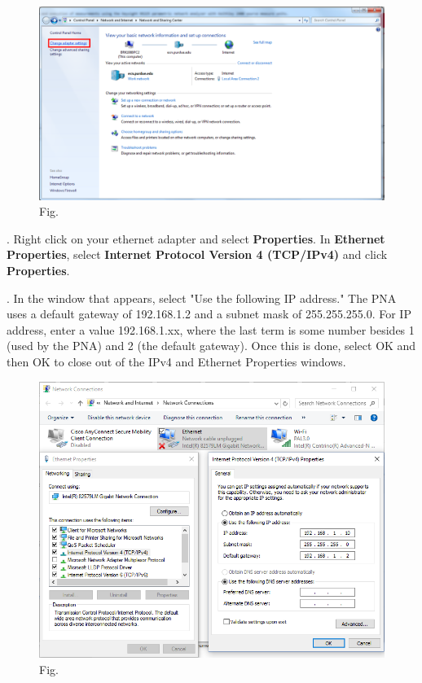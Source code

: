 \documentclass[]{article}
\begin{document}
\begin{figure}[H]
	\centering
	\includegraphics[width=\linewidth]{Figures/cp1}
	\caption{Fig.}
	\label{fig:cp1}
\end{figure}

\ex. Right click on your ethernet adapter and select \textbf{Properties}. In \textbf{Ethernet Properties}, select \textbf{Internet Protocol Version 4 (TCP/IPv4)} and click \textbf{Properties}. 

\ex. In the window that appears, select "Use the following IP address." The PNA uses a default gateway of 192.168.1.2 and a subnet mask of 255.255.255.0. For IP address, enter a value 192.168.1.xx, where the last term is some number besides 1 (used by the PNA) and 2 (the default gateway). Once this is done, select OK and then OK to close out of the IPv4 and Ethernet Properties windows.

\begin{figure}[H]
	\centering
	\includegraphics[width=\linewidth]{Figures/network}
	\caption{Fig.}
	\label{fig:cp2}
\end{figure}
\end{document}
